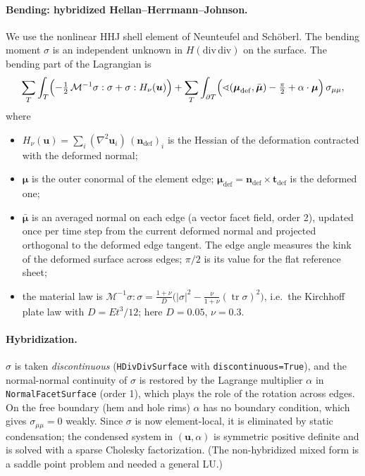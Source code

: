 \documentclass[11pt,a4paper]{article}
\newcommand{\bu}{\boldsymbol u}
\newcommand{\bn}{\boldsymbol n}
\newcommand{\bt}{\boldsymbol t}
\begin{document}
\paragraph{Bending: hybridized Hellan--Herrmann--Johnson.}
We use the nonlinear HHJ shell element of Neunteufel and Sch\"oberl. The bending moment
$\sigma$ is an independent unknown in $H(\mathrm{div\,div})$ on the surface. The bending
part of the Lagrangian is
\[
  \sum_{T} \int_T \Bigl( -\tfrac12\, \mathcal M^{-1}\sigma : \sigma + \sigma : H_\nu(\bu) \Bigr)
  + \sum_T \int_{\partial T} \Bigl( \sphericalangle(\boldsymbol\mu_{\mathrm{def}}, \bar{\boldsymbol\mu}) - \tfrac{\pi}{2}
     + \alpha\cdot\boldsymbol\mu \Bigr)\, \sigma_{\mu\mu},
\]
where
\begin{itemize}
  \item $H_\nu(\bu) = \sum_i (\nabla^2 \bu_i)\,(\bn_{\mathrm{def}})_i$ is the Hessian of the
        deformation contracted with the deformed normal;
  \item $\boldsymbol\mu$ is the outer conormal of the element edge; $\boldsymbol\mu_{\mathrm{def}}
        = \bn_{\mathrm{def}} \times \bt_{\mathrm{def}}$ is the deformed one;
  \item $\bar{\boldsymbol\mu}$ is an averaged normal on each edge (a vector facet field,
        order 2), updated once per time step from the current deformed normal and projected
        orthogonal to the deformed edge tangent. The edge angle measures the kink of the
        deformed surface across edges; $\pi/2$ is its value for the flat reference sheet;
  \item the material law is
        $\mathcal M^{-1}\sigma:\sigma = \frac{1+\nu}{D}\bigl(|\sigma|^2 - \frac{\nu}{1+\nu}(\operatorname{tr}\sigma)^2\bigr)$,
        i.e.\ the Kirchhoff plate law with $D = Et^3/12$; here $D = 0.05$, $\nu = 0.3$.
\end{itemize}

\paragraph{Hybridization.}
$\sigma$ is taken \emph{discontinuous} (\texttt{HDivDivSurface} with \texttt{discontinuous=True}),
and the normal-normal continuity of $\sigma$ is restored by the Lagrange multiplier
$\alpha$ in \texttt{NormalFacetSurface} (order 1), which plays the role of the rotation
across edges. On the free boundary (hem and hole rims) $\alpha$ has no boundary
condition, which gives $\sigma_{\mu\mu} = 0$ weakly. Since $\sigma$ is now element-local, it is
eliminated by static condensation; the condensed system in $(\bu, \alpha)$ is symmetric
positive definite and is solved with a sparse Cholesky factorization. (The non-hybridized
mixed form is a saddle point problem and needed a general LU.)
\end{document}
